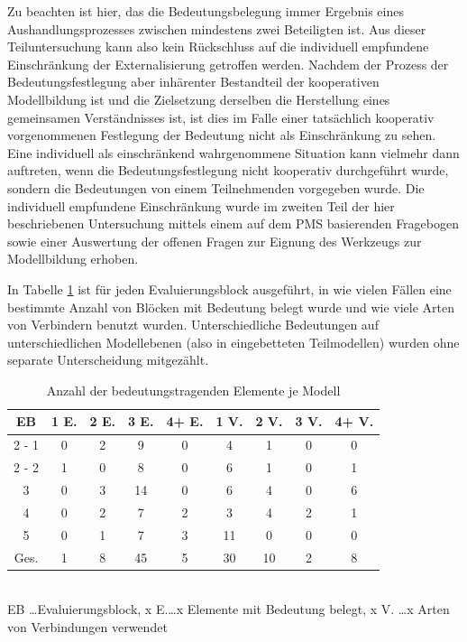Zu beachten ist hier, das die Bedeutungsbelegung immer Ergebnis eines Aushandlungsprozesses zwischen mindestens zwei Beteiligten ist. Aus dieser Teiluntersuchung kann also kein Rückschluss auf die individuell empfundene Einschränkung der Externalisierung getroffen werden. Nachdem der Prozess der Bedeutungsfestlegung aber inhärenter Bestandteil der kooperativen Modellbildung ist und die Zielsetzung derselben die Herstellung eines gemeinsamen Verständnisses ist, ist dies im Falle einer tatsächlich kooperativ vorgenommenen Festlegung der Bedeutung nicht als Einschränkung zu sehen. Eine individuell als einschränkend wahrgenommene Situation kann vielmehr dann auftreten, wenn die Bedeutungsfestlegung nicht kooperativ durchgeführt wurde, sondern die Bedeutungen von einem Teilnehmenden vorgegeben wurde. Die individuell empfundene Einschränkung wurde im zweiten Teil der hier beschriebenen Untersuchung mittels einem auf dem \gls{PMS} basierenden Fragebogen sowie einer Auswertung der offenen Fragen zur Eignung des Werkzeugs zur Modellbildung erhoben. 

In Tabelle \ref{tab:anzahl_bedeutungstragende_elemente} ist für jeden Evaluierungsblock ausgeführt, in wie vielen Fällen eine bestimmte Anzahl von Blöcken mit Bedeutung belegt wurde und wie viele Arten von Verbindern benutzt wurden. Unterschiedliche Bedeutungen auf unterschiedlichen Modellebenen (also in eingebetteten Teilmodellen) wurden ohne separate Unterscheidung mitgezählt.

\begin{table}[htbp]
	\centering
	\caption{Anzahl der bedeutungstragenden Elemente je Modell}
\begin{tabular}{| c || c | c | c | c || c | c | c | c |}
  \hline
   EB & 1 E. & 2 E. & 3 E. & 4+ E. & 1 V. & 2 V. & 3 V. & 4+ V. \\ \hline
   2 - 1 & 0 & 2 &  9 & 0 &  4 &  1 & 0 & 0 \\ 
   2 - 2 & 1 & 0 &  8 & 0 &  6 &  1 & 0 & 1 \\ 
   3     & 0 & 3 & 14 & 0 &  6 &  4 & 0 & 6 \\ 
   4     & 0 & 2 &  7 & 2 &  3 &  4 & 2 & 1 \\ 
   5     & 0 & 1 &  7 & 3 & 11 &  0 & 0 & 0 \\ \hline
   Ges.  & 1 & 8 & 45 & 5 & 30 & 10 & 2 & 8 \\ \hline
\end{tabular} \\
\footnotesize EB \ldots Evaluierungsblock, x E.\ldots x Elemente mit Bedeutung belegt, x V. \ldots x Arten von Verbindungen verwendet
	\label{tab:anzahl_bedeutungstragende_elemente}
\end{table}
 
